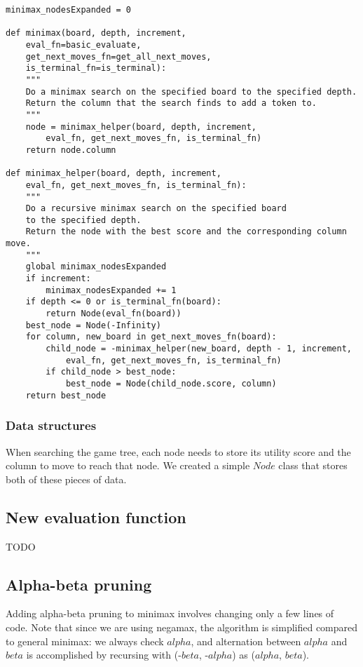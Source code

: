 \documentclass[11pt]{article}
\begin{document}
\lstset{language=Python}
\begin{lstlisting}[frame=single]
minimax_nodesExpanded = 0

def minimax(board, depth, increment,
	eval_fn=basic_evaluate,
	get_next_moves_fn=get_all_next_moves,
	is_terminal_fn=is_terminal):
	"""
	Do a minimax search on the specified board to the specified depth.
	Return the column that the search finds to add a token to.
	"""
	node = minimax_helper(board, depth, increment,
		eval_fn, get_next_moves_fn, is_terminal_fn)
	return node.column

def minimax_helper(board, depth, increment,
	eval_fn, get_next_moves_fn, is_terminal_fn):
	"""
	Do a recursive minimax search on the specified board
	to the specified depth.
	Return the node with the best score and the corresponding column move.
	"""
	global minimax_nodesExpanded
	if increment:
		minimax_nodesExpanded += 1
	if depth <= 0 or is_terminal_fn(board):
		return Node(eval_fn(board))
	best_node = Node(-Infinity)
	for column, new_board in get_next_moves_fn(board):
		child_node = -minimax_helper(new_board, depth - 1, increment,
			eval_fn, get_next_moves_fn, is_terminal_fn)
		if child_node > best_node:
			best_node = Node(child_node.score, column)
	return best_node
\end{lstlisting}

\subsubsection{Data structures}

When searching the game tree, each node needs to store its utility score and
the column to move to reach that node. We created a simple \(Node\) class that
stores both of these pieces of data.

\subsection{New evaluation function}

TODO

\subsection{Alpha-beta pruning}

Adding alpha-beta pruning to minimax involves changing only a few lines of code.
Note that since we are using negamax, the algorithm is simplified compared to
general minimax: we always check \(alpha\), and alternation between \(alpha\)
and \(beta\) is accomplished by recursing with (-\(beta\), -\(alpha\)) as
(\(alpha\), \(beta\)).
\end{document}
